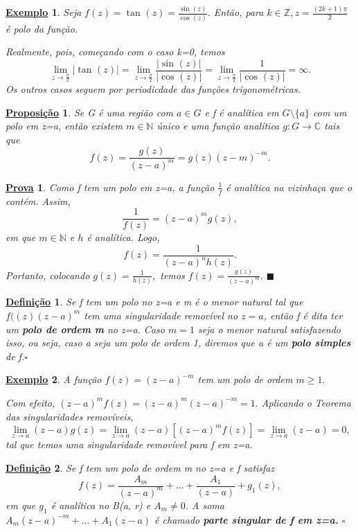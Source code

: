 \documentclass{article}
\newtheorem*{def*}{\underline{Defini\c c\~ao}}
\newtheorem{example}{\underline{Exemplo}}[section]
\newtheorem*{proof*}{\underline{Prova}}
\newtheorem*{prop*}{\underline{Proposi\c c\~ao}}
\renewcommand\qedsymbol{$\blacksquare$}
\begin{document}
  \begin{example}
    Seja \(f(z) = \tan^{}{(z)} = \frac{\sin^{}{(z)}}{\cos^{}{(z)}}.\) Então, para \(k\in \mathbb{Z}, z = \frac{(2k+1)\pi }{2}\) é polo da função.

  Realmente, pois, começando com o caso k=0, temos 
  \[
    \lim_{z\to \frac{\pi }{2}}|\tan^{}{(z)}| = \lim_{z\to \frac{\pi }{2}}\frac{|\sin^{}{(z)}|}{|\cos^{}{(z)}|} = \lim_{z\to \frac{\pi }{2}} \frac{1}{|\cos^{}{(z)}|} = \infty.
  \] 
  Os outros casos seguem por periodicdade das funções trigonométricas.
  \end{example}
  \begin{prop*}
    Se G é uma região com \(a\in G\) e f é analítica em \(G\setminus{\{a\}}\) com um polo em z=a, então existem \(m\in \mathbb{N}\) único e uma função
analítica \(g:G\rightarrow \mathbb{C}\) tais que 
  \[
    f(z) = \frac{g(z)}{(z-a)^{m}} = g(z)(z-m)^{-m}.
  \]
  \end{prop*}
 \begin{proof*}
  Como f tem um polo em z=a, a função \(\frac{1}{f}\) é analítica na vizinhaça que o contém. Assim, 
    \[
      \frac{1}{f(z)} = (z-a)^{m}g(z),
    \]
  em que \(m\in \mathbb{N}\) e \(h\) é analítica. Logo,
    \[
      f(z) = \frac{1}{(z-a)^{n}h(z)}.
    \]
  Portanto, colocando \(g(z) = \frac{1}{h(z)},\) temos \(f(z) = \frac{g(z)}{(z-a)^{m}}.\) \qedsymbol
 \end{proof*}
 \begin{def*}
  Se f tem um polo no z=a e m é o menor natural tal que \(f((z)(z-a)^{m}\) tem uma singularidade removível no \(z=a\), então f é dita ter
um \textbf{polo de ordem m} no z=a. Caso \(m=1\) seja o menor natural satisfazendo isso, ou seja, caso a seja um polo de ordem 1, diremos que a é um \textbf{polo simples} de f.\(\square\)
 \end{def*}
 \begin{example}
  A função \(f(z) = (z-a)^{-m}\) tem um polo de ordem \(m\geq 1.\)

  Com efeito, \((z-a)^{m}f(z) = (z-a)^{m}(z-a)^{-m} = 1.\) Aplicando o Teorema das singularidades removíveis,
  \[
    \lim_{z\to a}(z-a)g(z)=\lim_{z\to a}(z-a)[(z-a)^{m}f(z)] = \lim_{z\to a}(z-a)=0,
  \]
  tal que temos uma singularidade removível para f em z=a. 
 \end{example}
 \begin{def*}
  Se f tem um polo de ordem m no z=a e f satisfaz 
    \[
      f(z) = \frac{A_{m}}{(z-a)^{m}}+\dotsc +\frac{A_{1}}{(z-a)} + g_{1}(z),
    \]
  em que \(g_{1}\) é analítica no B(a, r) e \(A_{m}\neq0\). A soma \(A_{m}(z-a)^{-m}+\dotsc +A_{1}(z-a)\) é chamado
\textbf{parte singular de f em z=a.} \(\square\)
\end{def*}
  \newpage
\end{document}
